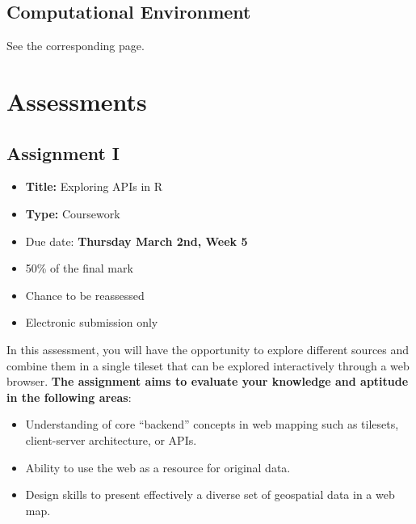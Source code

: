 \documentclass[
  letterpaper,
  DIV=11,
  numbers=noendperiod]{scrreprt}
\providecommand{\tightlist}{%
  \setlength{\itemsep}{0pt}\setlength{\parskip}{0pt}}\usepackage{longtable,booktabs,array}
\begin{document}
\section*{Computational Environment}\label{computational-environment}


See the corresponding page.


\chapter*{Assessments}\label{assessments}


\section*{Assignment I}\label{assignment-i}


\begin{itemize}
\tightlist
\item
  \textbf{Title:} Exploring APIs in R
\item
  \textbf{Type:} Coursework
\item
  Due date: \textbf{Thursday March 2nd, Week 5}
\item
  50\% of the final mark
\item
  Chance to be reassessed
\item
  Electronic submission only
\end{itemize}

In this assessment, you will have the opportunity to explore different
sources and combine them in a single tileset that can be explored
interactively through a web browser. \textbf{The assignment aims to
evaluate your knowledge and aptitude in the following areas}:

\begin{itemize}
\item
  Understanding of core ``backend'' concepts in web mapping such as
  tilesets, client-server architecture, or APIs.
\item
  Ability to use the web as a resource for original data.
\item
  Design skills to present effectively a diverse set of geospatial data
  in a web map.
\end{itemize}
\end{document}
